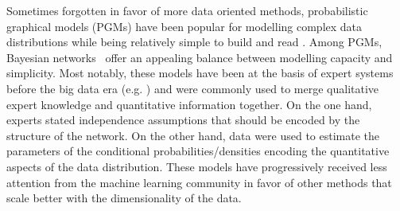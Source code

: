 Sometimes forgotten in favor of more data oriented methods, probabilistic graphical models (PGMs) have been popular for modelling complex data distributions while being relatively simple to build and read \citep{PGM-book, johnson2016composing}. Among PGMs, Bayesian networks~\citep[BNs, ][]{Pearl-BN} offer an appealing balance between modelling capacity and simplicity. Most notably, these models have been at the basis of expert systems before the big data era (e.g. \citep{BN-app-1, BN-app-2, BN-app-3}) and were commonly used to merge qualitative expert knowledge and quantitative information together. On the one hand, experts stated independence assumptions that should be encoded by the structure of the network. On the other hand, data were used to estimate the parameters of the conditional probabilities/densities encoding the quantitative aspects of the data distribution. %
These models have progressively received less attention from the machine learning community in favor of other methods that scale better with the dimensionality of the data. %

